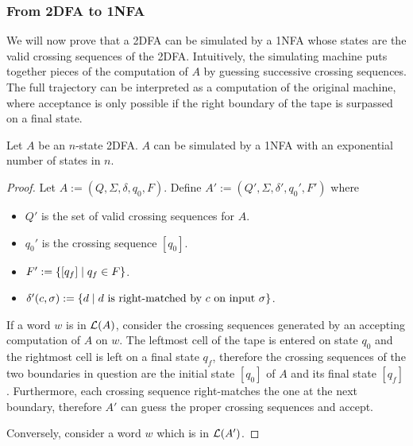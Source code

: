 \subsubsection{From 2DFA to 1NFA}
We will now prove that a 2DFA can be simulated by a 1NFA whose states are the valid crossing sequences of the 2DFA.
Intuitively, the simulating machine puts together pieces of the computation of $A$ by guessing successive crossing sequences. The full trajectory can be interpreted as a computation of the original machine, where acceptance is only possible if the right boundary of the tape is surpassed on a final state.
\begin{thrm}
	Let $A$ be an $n$-state 2DFA. $A$ can be simulated by a 1NFA with an exponential number of states in $n$.
\end{thrm}
\begin{proof}
	Let $A:=(Q,\Sigma,\delta,q_0,F)$. Define $A':=(Q',\Sigma,\delta',q_0',F')$ where
	\begin{itemize}
		\item $Q'$ is the set of valid crossing sequences for $A$.
		\item $q_0'$ is the crossing sequence $[q_0]$.
		\item $F':=\{[q_f] \mid q_f\in F\}$.
		\item $\delta'(c,\sigma):=\{d \mid \text{$d$ is right-matched by $c$ on input $\sigma$}\}$.
	\end{itemize}

	If a word $w$ is in $\mathcal L(A)$, consider the crossing sequences generated by an accepting computation of $A$ on $w$.
	The leftmost cell of the tape is entered on state $q_0$ and the rightmost cell is left on a final state $q_f$, therefore the crossing sequences of the two boundaries in question are the initial state $[q_0]$ of $A$ and its final state $[q_f]$.
	Furthermore, each crossing sequence right-matches the one at the next boundary, therefore $A'$ can guess the proper crossing sequences and accept.

	Conversely, consider a word $w$ which is in $\mathcal L(A')$.
\end{proof}
